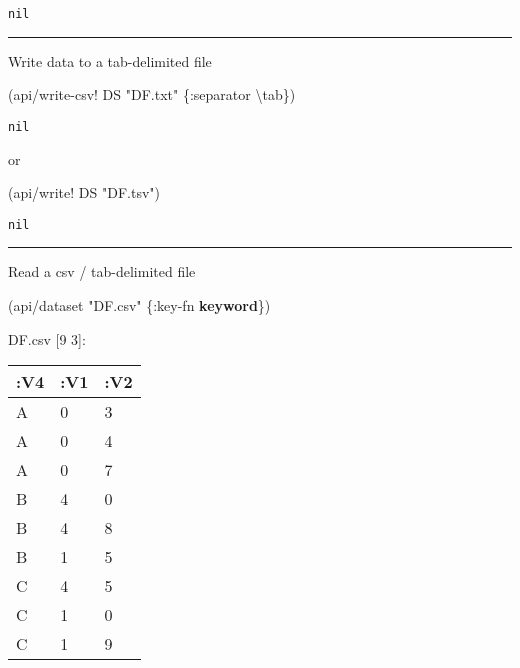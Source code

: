 \documentclass[]{article}
\newenvironment{Shaded}{\begin{snugshade}}{\end{snugshade}}
\newcommand{\AttributeTok}[1]{\textcolor[rgb]{0.77,0.63,0.00}{#1}}
\newcommand{\CharTok}[1]{\textcolor[rgb]{0.31,0.60,0.02}{#1}}
\newcommand{\KeywordTok}[1]{\textcolor[rgb]{0.13,0.29,0.53}{\textbf{#1}}}
\newcommand{\NormalTok}[1]{#1}
\newcommand{\StringTok}[1]{\textcolor[rgb]{0.31,0.60,0.02}{#1}}
\begin{document}
\begin{verbatim}
nil
\end{verbatim}

\begin{center}\rule{0.5\linewidth}{0.5pt}\end{center}

Write data to a tab-delimited file

\begin{Shaded}
\begin{Highlighting}[]
\NormalTok{(api/write-csv! DS }\StringTok{"DF.txt"}\NormalTok{ \{}\AttributeTok{:separator} \CharTok{\textbackslash{}tab}\NormalTok{\})}
\end{Highlighting}
\end{Shaded}

\begin{verbatim}
nil
\end{verbatim}

or

\begin{Shaded}
\begin{Highlighting}[]
\NormalTok{(api/write! DS }\StringTok{"DF.tsv"}\NormalTok{)}
\end{Highlighting}
\end{Shaded}

\begin{verbatim}
nil
\end{verbatim}

\begin{center}\rule{0.5\linewidth}{0.5pt}\end{center}

Read a csv / tab-delimited file

\begin{Shaded}
\begin{Highlighting}[]
\NormalTok{(api/dataset }\StringTok{"DF.csv"}\NormalTok{ \{}\AttributeTok{:key-fn} \KeywordTok{keyword}\NormalTok{\})}
\end{Highlighting}
\end{Shaded}

DF.csv {[}9 3{]}:

\begin{longtable}[]{@{}lll@{}}
\toprule
:V4 & :V1 & :V2\tabularnewline
\midrule
\endhead
A & 0 & 3\tabularnewline
A & 0 & 4\tabularnewline
A & 0 & 7\tabularnewline
B & 4 & 0\tabularnewline
B & 4 & 8\tabularnewline
B & 1 & 5\tabularnewline
C & 4 & 5\tabularnewline
C & 1 & 0\tabularnewline
C & 1 & 9\tabularnewline
\bottomrule
\end{longtable}
\end{document}
